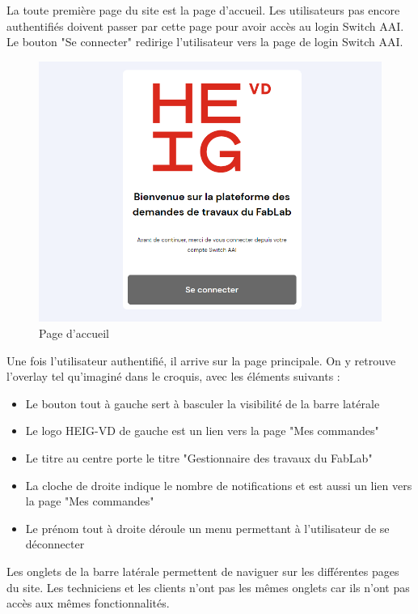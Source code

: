 \documentclass[
    iai, %
    eai, %
]{heig-tb}
\begin{document}
La toute première page du site est la page d'accueil. Les utilisateurs pas encore authentifiés doivent passer par cette page pour avoir accès au login Switch AAI.
Le bouton "Se connecter" redirige l'utilisateur vers la page de login Switch AAI.

\begin{figure}[h]
  \includegraphics[width=14cm]{ui_welcome.PNG}
  \caption{Page d'accueil}
  \label{img:welcome}
\end{figure}

Une fois l'utilisateur authentifié, il arrive sur la page principale.
On y retrouve l'overlay tel qu'imaginé dans le croquis, avec les éléments suivants :
\begin{itemize}
  \item Le bouton tout à gauche sert à basculer la visibilité de la barre latérale
  \item Le logo HEIG-VD de gauche est un lien vers la page "Mes commandes"
  \item Le titre au centre porte le titre "Gestionnaire des travaux du FabLab"
  \item La cloche de droite indique le nombre de notifications et est aussi un lien vers la page "Mes commandes"
  \item Le prénom tout à droite déroule un menu permettant à l'utilisateur de se déconnecter
\end{itemize}
\bigskip

Les onglets de la barre latérale permettent de naviguer sur les différentes pages du site. Les techniciens et les clients n'ont pas les mêmes onglets car ils n'ont pas accès aux mêmes fonctionnalités.
\end{document}

